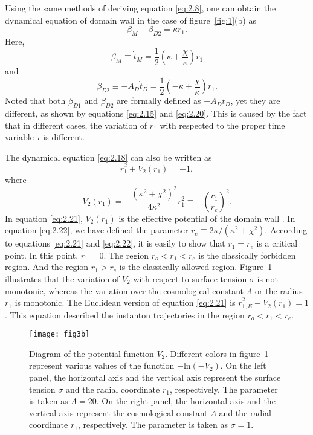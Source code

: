 \documentclass[12pt]{article}
\begin{document}
Using the same methods of deriving equation \eqref{eq:2.8}, one can obtain the dynamical equation of domain wall \uppercase\expandafter{} in the case of figure~\ref{fig:1}(b) as
\begin{equation}
\label{eq:2.18}%
\beta_{M}-\beta_{D2}=\kappa r_{1}.
\end{equation}
Here,
\begin{equation}
\label{eq:2.19}%
\beta_{M}\equiv \dot{t}_{M}=\frac{1}{2}(\kappa+\frac{\chi}{\kappa})r_{1}
\end{equation}
and
\begin{equation}
\label{eq:2.20}%
\beta_{D2}\equiv -A_{D}\dot{t}_{D}=\frac{1}{2}(-\kappa+\frac{\chi}{\kappa})r_{1}.
\end{equation}
Noted that both $\beta_{D1}$ and $\beta_{D2}$ are formally defined as $-A_{D}\dot{t}_{D}$, yet they are different, as shown by equations \eqref{eq:2.15} and \eqref{eq:2.20}. This is caused by the fact that in different cases, the variation of $r_{1}$ with respected to the proper time variable $\tau$ is different.

The dynamical equation \eqref{eq:2.18} can also be written as
\begin{equation}
\label{eq:2.21}%
\dot{r}_{1}^{2}+V_{2}(r_{1})=-1,
\end{equation}
where
\begin{equation}
\label{eq:2.22}%
V_{2}(r_{1})=-\frac{(\kappa^{2}+\chi^{2})^{2}}{4\kappa^{2}}r_{1}^{2}\equiv-(\frac{r_{1}}{r_{e}})^{2}.
\end{equation}
In equation \eqref{eq:2.21}, $V_{2}(r_{1})$ is the effective potential of the domain wall \uppercase\expandafter{}. In equation \eqref{eq:2.22}, we have defined the parameter $r_{e}\equiv2\kappa/(\kappa^{2}+\chi^{2})$. According to equations \eqref{eq:2.21} and \eqref{eq:2.22}, it is easily to show that $r_{1}=r_{e}$ is a critical point. In this point, $\dot{r}_{1}=0$. The region $r_{o}<r_{1}<r_{e}$ is the classically forbidden region. And the region $r_{1}>r_{e}$ is the classically allowed region. Figure~\ref{fig:5} illustrates that the variation of $V_{2}$ with respect to surface tension $\sigma$ is not monotonic, whereas the variation over the cosmological constant $\Lambda$ or the radius $r_{1}$ is monotonic. The Euclidean version of equation \eqref{eq:2.21} is $\dot{r}_{1,E}^{2}-V_{2}(r_{1})=1$. This equation described the instanton trajectories in the region $r_{o}<r_{1}<r_{e}$.

\begin{figure}[tbp]
\centering
\texttt{[image: fig3b]}
\caption{\label{fig:5} Diagram of the potential function $V_{2}$. Different colors in figure~\ref{fig:5} represent various values of the function $-\mathrm{ln}(-V_{2})$. On the left panel, the horizontal axis and the vertical axis represent the surface tension $\sigma$ and the radial coordinate $r_{1}$, respectively. The parameter is taken as $\Lambda=20$. On the right panel, the horizontal axis and the vertical axis represent the cosmological constant $\Lambda$ and the radial coordinate $r_{1}$, respectively.  The parameter is taken as $\sigma=1$.}
\end{figure}
\end{document}
